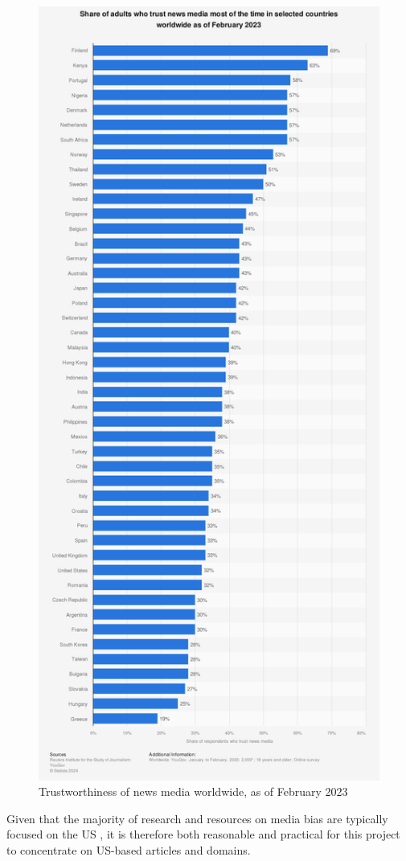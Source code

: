 \begin{figure}[htbp]
    \centering
    \includegraphics[width=0.6\linewidth]{images/statistic_id308468_trustworthiness-of-news-media-worldwide-2023.png}
    \caption{Trustworthiness of news media worldwide, as of February 2023 \cite{reuters-2023-trust}}
    \label{fig:trustworthiness-of-news-media-worldwide-2023}
\end{figure}

Given that the majority of research and resources on media bias are typically focused on the US \cite{allsides, adfontes,rodrigo-2024-systematic-review-media-bias}, it is therefore both reasonable and practical for this project to concentrate on US-based articles and domains.

